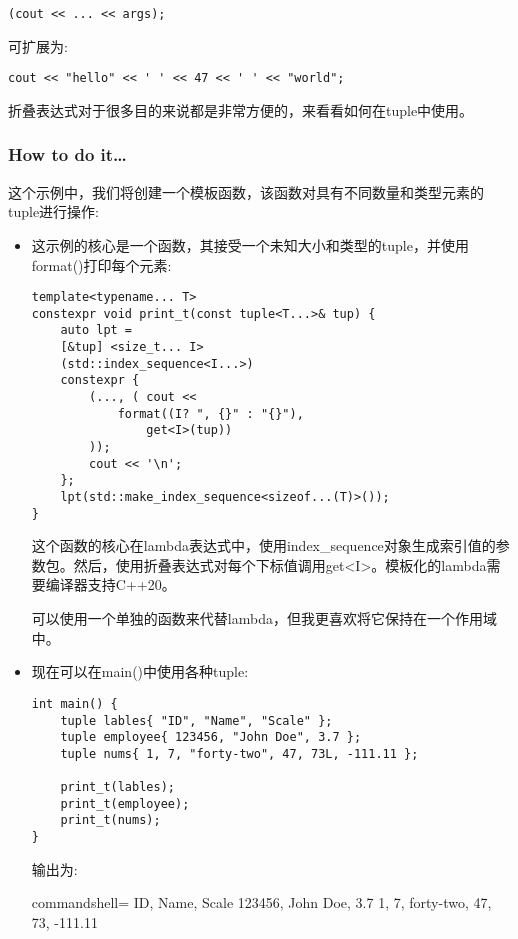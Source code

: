 \begin{lstlisting}[style=styleCXX]
(cout << ... << args);
\end{lstlisting}

可扩展为:

\begin{lstlisting}[style=styleCXX]
cout << "hello" << ' ' << 47 << ' ' << "world";
\end{lstlisting}

折叠表达式对于很多目的来说都是非常方便的，来看看如何在tuple中使用。

\subsubsection{How to do it…}

这个示例中，我们将创建一个模板函数，该函数对具有不同数量和类型元素的tuple进行操作:

\begin{itemize}
\item 
这示例的核心是一个函数，其接受一个未知大小和类型的tuple，并使用format()打印每个元素:

\begin{lstlisting}[style=styleCXX]
template<typename... T>
constexpr void print_t(const tuple<T...>& tup) {
	auto lpt =
	[&tup] <size_t... I>
	(std::index_sequence<I...>)
	constexpr {
		(..., ( cout <<
			format((I? ", {}" : "{}"),
				get<I>(tup))
		));
		cout << '\n';
	};
	lpt(std::make_index_sequence<sizeof...(T)>());
}
\end{lstlisting}

这个函数的核心在lambda表达式中，使用index\_sequence对象生成索引值的参数包。然后，使用折叠表达式对每个下标值调用get<I>。模板化的lambda需要编译器支持C++20。

可以使用一个单独的函数来代替lambda，但我更喜欢将它保持在一个作用域中。

\item 
现在可以在main()中使用各种tuple:

\begin{lstlisting}[style=styleCXX]
int main() {
	tuple lables{ "ID", "Name", "Scale" };
	tuple employee{ 123456, "John Doe", 3.7 };
	tuple nums{ 1, 7, "forty-two", 47, 73L, -111.11 };
	
	print_t(lables);
	print_t(employee);
	print_t(nums);
}
\end{lstlisting}

输出为:

\begin{tcblisting}{commandshell={}}
ID, Name, Scale
123456, John Doe, 3.7
1, 7, forty-two, 47, 73, -111.11
\end{tcblisting}
\end{itemize}


